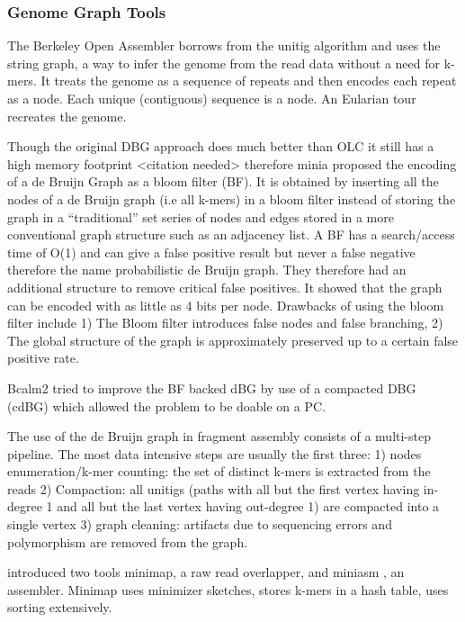 \documentclass[11pt]{article}
\begin{document}
\subsubsection{Genome Graph Tools}
\label{sec:org97e2f29}
The Berkeley Open Assembler \cite{myersFragmentAssemblyString2005} borrows 
from the unitig algorithm and uses the string graph, a way to infer the genome
from the read data without a need for k-mers.
It treats the genome as a sequence of repeats and then encodes each repeat as 
a node. Each unique (contiguous) sequence is a node. An Eularian tour recreates
the genome.

Though the original DBG approach does much better than OLC it still has a high 
memory footprint <citation needed> therefore minia
\cite{chikhiSpaceefficientExactBruijn2013} proposed the encoding of a 
de Bruijn Graph as a bloom filter (BF). It is obtained by inserting all the
nodes of a de Bruijn graph (i.e all k-mers) in a bloom filter instead of storing 
the graph in a “traditional” set series of nodes and edges stored in a more
conventional graph structure such as an adjacency list. 
A BF has a search/access time of O(1) and can give a false positive result but
never a false negative therefore the name probabilistic de Bruijn graph.  
They therefore had an additional structure to remove critical false positives.
It showed that the graph can be encoded with as little as 4 bits per node.
Drawbacks of using the bloom filter include 1) The Bloom filter introduces false
nodes and false branching, 2) The global structure of the graph is approximately
preserved up to a certain false positive rate.

Bcalm2 \cite{chikhiCompactingBruijnGraphs2016} tried to improve the BF backed dBG 
by use of a compacted DBG (cdBG) which allowed the problem to be doable on a PC.


The use of the de Bruijn graph in fragment assembly consists of a multi-step 
pipeline.
The most data intensive steps are usually the first three: 1) nodes
enumeration/k-mer counting: the set of distinct k-mers is extracted from the 
reads 2) Compaction: all unitigs (paths with all but the first vertex having 
in-degree 1 and all but the last vertex having out-degree 1) are compacted into
a single vertex 3) graph cleaning: artifacts due to sequencing errors and
polymorphism are removed from the graph.

\cite{liMinimapMiniasmFast2016} introduced two tools minimap, a raw read 
overlapper, and miniasm \cite{liMinimapMiniasmFast2016}, an assembler. 
Minimap uses minimizer sketches, stores k-mers in a hash table, uses sorting 
extensively.
\end{document}
